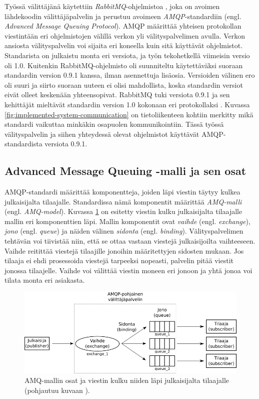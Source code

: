 Työssä välittäjänä käytettiin \emph{RabbitMQ}-ohjelmistoa \cite{rabbitmq-homepage}, joka on avoimen lähdekoodin välittäjäpalvelin ja perustuu avoimeen \emph{AMQP}-standardiin \cite{amqp-homepage} (engl. \emph{Advanced Message Queuing Protocol}). AMQP määrittää yhteisen protokollan viestintään eri ohjelmistojen välillä verkon yli välityspalvelimen avulla. Verkon ansiosta välityspalvelin voi sijaita eri koneella kuin sitä käyttävät ohjelmistot. Standarista on julkaistu monta eri versiota, ja työn tekohetkellä viimeisin versio oli 1.0. Kuitenkin RabbitMQ-ohjelmisto oli suunniteltu käytettäväksi suoraan standardin version 0.9.1 kanssa, ilman asennettuja lisäosia. Versioiden välinen ero oli suuri ja siirto suoraan uuteen ei olisi mahdollista, koska standardin versiot eivät olleet keskenään yhteensopivat. RabbitMQ tuki versiota 0.9.1 ja sen kehittäjät mieltävät standardin version 1.0 kokonaan eri protokollaksi \mbox{\cite{RabbitMQ-Compatibility-and-Conformance}}. Kuvassa \ref{fig:implemented-system-communication} on tietoliikenteen kohtiin merkitty mikä standardi vaikuttaa minkäkin osapuolen kommunikointiin. Tässä työssä välityspalvelin ja siihen yhteydessä olevat ohjelmistot käyttävät AMQP-standardista versiota 0.9.1.


\subsection{Advanced Message Queuing -malli ja sen osat}
AMQP-standardi määrittää komponentteja, joiden läpi viestin täytyy kulkea julkaisijalta tilaajalle. Standardissa nämä komponentit määrittää \emph{AMQ-malli} (engl. \emph{AMQ-model}). Kuvassa \ref{fig:amq-model-parts} on esitetty viestin kulku julkaisijalta tilaajalle mallin eri komponenttien läpi. Mallin komponentit ovat \emph{vaihde} (engl. \emph{exchange}), \emph{jono} (engl. \emph{queue}) ja näiden välinen \emph{sidonta} (engl. \emph{binding}). Välityspalvelimen tehtävän voi tiivistää niin, että se ottaa vastaan viestejä julkaisijoilta vaihteeseen. Vaihde reitittää viestejä tilaajille jonoihin määritettyjen sidosten mukaan. Jos tilaaja ei ehdi prosessoida viestejä tarpeeksi nopeasti, palvelin pitää viestit jonossa tilaajelle. Vaihde voi välittää viestin moneen eri jonoon ja yhtä jonoa voi tilata monta eri asiakasta.

\begin{figure}[ht!]
	\includegraphics[width=1\textwidth]{pictures/amq-model-parts.png}
	\caption{AMQ-mallin osat ja viestin kulku niiden läpi julkaisijalta tilaajalle (pohjautuu kuvaan \mbox{\cite[s.~11]{AMQP-specification}}).}
	\label{fig:amq-model-parts}
\end{figure}

